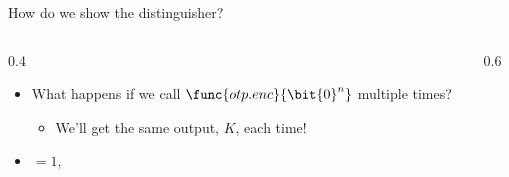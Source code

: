 \ifdefined\PRESENTATION\else\PassOptionsToClass{handout}{beamer}\fi\documentclass[aspectratio=169, lualatex]{beamer}
\begin{document}
\begin{frame}{How do we show the distinguisher?}
	\begin{columns}[c]
		\begin{column}{0.4\textwidth}
			\begin{itemize}[<+->]
				\item What happens if we call $\func{otp.enc}{\bit{0}^n}$ multiple times?
				      \begin{itemize}
					      \item We'll get the same output, $K$, each time!
				      \end{itemize}
				\item {} $= 1$,
			\end{itemize}
		\end{column}
		\begin{column}{0.6\textwidth}
			\begin{flushright}
			\end{flushright}
		\end{column}
	\end{columns}
\end{frame}
\end{document}
